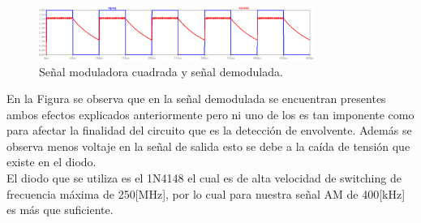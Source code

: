 \documentclass[letterpaper, titlepage]{article}
\begin{document}
		\begin{figure}[H]
			\centering
				\includegraphics[width=0.8\textwidth]{graficodemod}
			\caption{Señal moduladora cuadrada y señal demodulada.}
			\label{fig:ejemplo}
		\end{figure}

		En la Figura se observa que en la señal demodulada se encuentran presentes ambos efectos explicados anteriormente pero ni uno de los es tan imponente como para afectar la finalidad del circuito que es la detección de envolvente. Además se observa menos voltaje en la señal de salida esto se debe a la caída de tensión que existe en el diodo.\\
		
		El diodo que se utiliza es el 1N4148 el cual es de alta velocidad de switching de frecuencia máxima de 250[MHz], por lo cual para nuestra señal AM de 400[kHz] es más que suficiente.

\newpage
\end{document}
